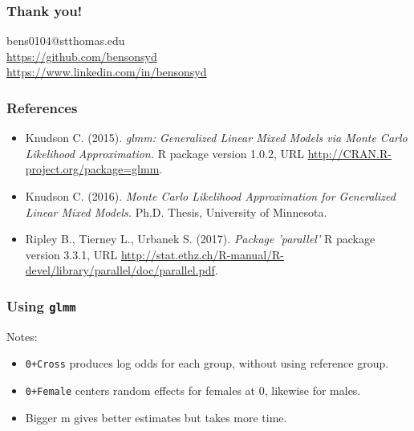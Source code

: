 \documentclass{beamer}
\newcommand\Fontvi{\fontsize{9}{7.2}\selectfont}
\begin{document}
\begin{frame}
\frametitle{Thank you!}
\begin{center}

bens0104@stthomas.edu \\
\url{https://github.com/bensonsyd}\\
\url{https://www.linkedin.com/in/bensonsyd}


\end{center}

\end{frame}

\begin{frame}
\frametitle{References}
\Fontvi
\begin{itemize}
\item[] Knudson C. (2015). \textit{glmm: Generalized Linear Mixed Models via Monte Carlo Likelihood
Approximation.} R package version 1.0.2, URL \url{http://CRAN.R-project.org/package=glmm}.\\ \vspace{.1cm}

\item[] Knudson C. (2016). \textit{Monte Carlo Likelihood Approximation for Generalized Linear Mixed Models.} Ph.D. Thesis, University of Minnesota.\\ \vspace{.1cm}

\item[] Ripley B., Tierney L., Urbanek S. (2017). \textit{Package 'parallel'} R package version 3.3.1, URL \url{http://stat.ethz.ch/R-manual/R-devel/library/parallel/doc/parallel.pdf}. \\ \vspace{.1cm}

\end{itemize}
\end{frame}

\begin{frame}
\frametitle{Using \texttt{glmm}}

Notes:
\begin{itemize}
\item \texttt{0+Cross} produces log odds for each group, without using reference group.
\item \texttt{0+Female} centers random effects for females at 0, likewise for males.
\item Bigger m gives better estimates but takes more time.
\end{itemize}

\end{frame}
\end{document}
